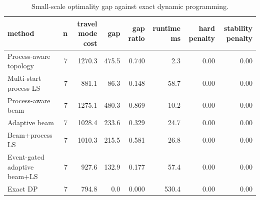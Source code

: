 \begin{table}[t]
\centering
\caption{Small-scale optimality gap against exact dynamic programming.}
\label{tab:exact-gap-summary}
\begin{tabular}{lrrrrrrr}
\toprule
method & n & travel mode cost & gap & gap ratio & runtime ms & hard penalty & stability penalty \\
\midrule
Process-aware topology & 7 & 1270.3 & 475.5 & 0.740 & 2.3 & 0.00 & 0.00 \\
Multi-start process LS & 7 & 881.1 & 86.3 & 0.148 & 58.7 & 0.00 & 0.00 \\
Process-aware beam & 7 & 1275.1 & 480.3 & 0.869 & 10.2 & 0.00 & 0.00 \\
Adaptive beam & 7 & 1028.4 & 233.6 & 0.329 & 24.7 & 0.00 & 0.00 \\
Beam+process LS & 7 & 1010.3 & 215.5 & 0.581 & 26.8 & 0.00 & 0.00 \\
Event-gated adaptive beam+LS & 7 & 927.6 & 132.9 & 0.177 & 57.4 & 0.00 & 0.00 \\
Exact DP & 7 & 794.8 & 0.0 & 0.000 & 530.4 & 0.00 & 0.00 \\
\bottomrule
\end{tabular}
\end{table}
